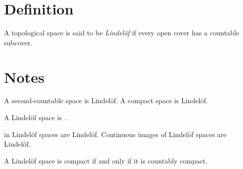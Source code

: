 \documentclass[12pt]{article}
\begin{document}
\section*{Definition}

A topological space is said to be \emph{Lindel\"of} if every open cover has a countable subcover.

\section*{Notes}

A second-countable space is Lindel\"of.
A compact space is Lindel\"of.

A  Lindel\"of space is .

 in Lindel\"of spaces are Lindel\"of.
Continuous images of Lindel\"of spaces are Lindel\"of.

A Lindel\"of space is compact if and only if it is countably compact.
\end{document}
